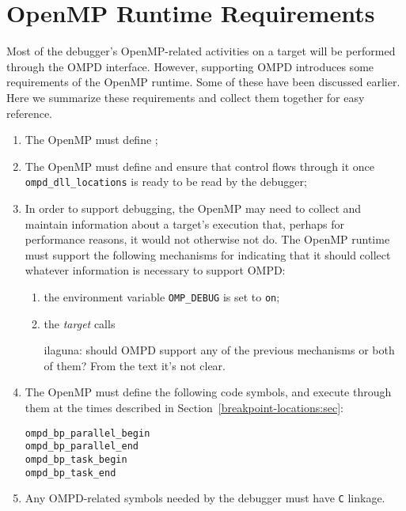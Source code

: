 \section{OpenMP Runtime Requirements}
\label{openmp-runtime-requirements:sec}

Most of the debugger's OpenMP-related activities on a target will
be performed through the OMPD interface.
However, supporting OMPD introduces some requirements of the OpenMP runtime.
Some of these have been discussed earlier.
Here we summarize these requirements and collect them together
for easy reference.

\begin{enumerate}
\item
  The OpenMP must define
  ;
\item
  The OpenMP must define
  and ensure that control flows through it once
  \texttt{ompd\_dll\_locations} is ready to be read by the debugger;
\item
  In order to support debugging, the OpenMP may need to collect and
  maintain information about a target's execution that, perhaps for
  performance reasons, it would not otherwise not do.
  The OpenMP runtime must support the following mechanisms for
  indicating that it should collect whatever information is
  necessary to support OMPD:
  \begin{enumerate}
  \item
    the environment variable \texttt{OMP\_DEBUG} is set to \texttt{on};
  \item
    the \emph{target} calls
\begin{notes}
ilaguna: should OMPD support any of the previous mechanisms or both of 
them? From the text it's not clear.
\end{notes}
  \end{enumerate}
\item
  The OpenMP must define the following code symbols, and execute through
  them at the times described in Section~\ref{breakpoint-locations:sec}:
  \begin{description}
  \item [\texttt{ompd\_bp\_parallel\_begin}]
  \item [\texttt{ompd\_bp\_parallel\_end}]
  \item [\texttt{ompd\_bp\_task\_begin}]
  \item [\texttt{ompd\_bp\_task\_end}]
  \end{description}
\item
  Any OMPD-related symbols needed by the debugger must have \texttt{C} linkage.
\end{enumerate}

